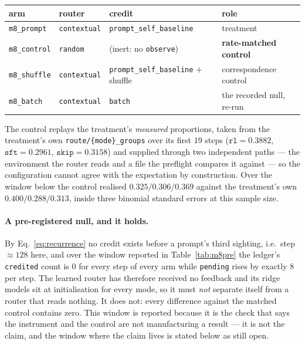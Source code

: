 \begin{center}\small
\begin{tabular}{llll}
\toprule
arm & router & credit & role \\
\midrule
\texttt{m8\_prompt}  & \texttt{contextual} & \texttt{prompt\_self\_baseline} & treatment \\
\texttt{m8\_control} & \texttt{random}     & (inert: no \texttt{observe}) & \textbf{rate-matched control} \\
\texttt{m8\_shuffle} & \texttt{contextual} & \texttt{prompt\_self\_baseline} $+$ shuffle & correspondence control \\
\texttt{m8\_batch}   & \texttt{contextual} & \texttt{batch} & the recorded null, re-run \\
\bottomrule
\end{tabular}
\end{center}

The control replays the treatment's \emph{measured} proportions, taken from the treatment's own
\texttt{route/\{mode\}\_groups} over its first $19$ steps
($\mathtt{rl}=0.3882$, $\mathtt{sft}=0.2961$, $\mathtt{skip}=0.3158$) and supplied through two
independent paths --- the environment the router reads and a file the preflight compares it
against --- so the configuration cannot agree with the expectation by construction. Over the
window below the control realised $0.325/0.306/0.369$ against the treatment's own
$0.400/0.288/0.313$, inside three binomial standard errors at this sample size.

\paragraph{A pre-registered null, and it holds.} By Eq.~\ref{eq:recurrence} no credit exists
before a prompt's third sighting, i.e.\ step $\approx128$ here, and over the window reported in
Table~\ref{tab:m8pre} the ledger's \texttt{credited} count is $0$ for every step of every arm
while \texttt{pending} rises by exactly $8$ per step. The learned router has therefore received
no feedback and its ridge models sit at initialisation for every mode, so it must \emph{not}
separate itself from a router that reads nothing. It does not: every difference against the
matched control contains zero. This window is reported because it is the check that says the
instrument and the control are not manufacturing a result --- it is not the claim, and the
window where the claim lives is stated below as still open.


